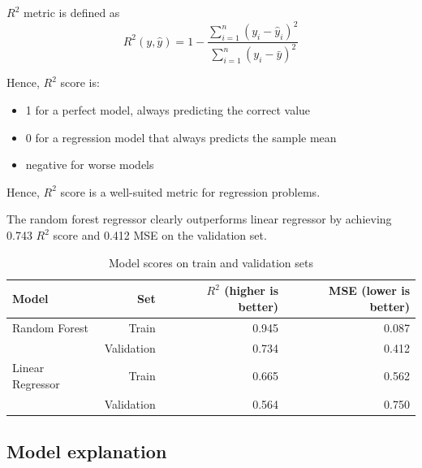 \documentclass[conference]{IEEEtran}
\begin{document}
$R^2$ metric is defined as 
\begin{equation}
    R^2(y, \hat{y}) = 1 - \frac{\sum_{i=1}^{n} (y_i - \hat{y}_i)^2}{\sum_{i=1}^{n} (y_i - \bar{y})^2} \label{eq:r2}
\end{equation}

Hence, $R^2$ score is:
\begin{itemize}
    \item 1 for a perfect model, always predicting the correct value
    \item 0 for a regression model that always predicts the sample mean
    \item negative for worse models
\end{itemize}
Hence, $R^2$ score is a well-suited metric for regression problems. 

The random forest regressor clearly outperforms linear regressor 
by achieving 0.743 $R^2$ score and 0.412 MSE on the validation set.

\begin{table}[htbp]
    \caption{Model scores on train and validation sets}
\begin{center}
\begin{tabular}{lrrr}
    \hline
    {Model} & Set &  $R^2$ (higher is better) &  MSE (lower is better) \\
    \hline
    Random Forest    & Train      & 0.945 & 0.087 \\
                     & Validation & 0.734 & 0.412 \\
    Linear Regressor & Train      & 0.665 & 0.562 \\
                     & Validation & 0.564 & 0.750 \\
    \hline
\end{tabular}
\label{table:model-scores}
\end{center}
\end{table}

\subsection{Model explanation}
\end{document}
